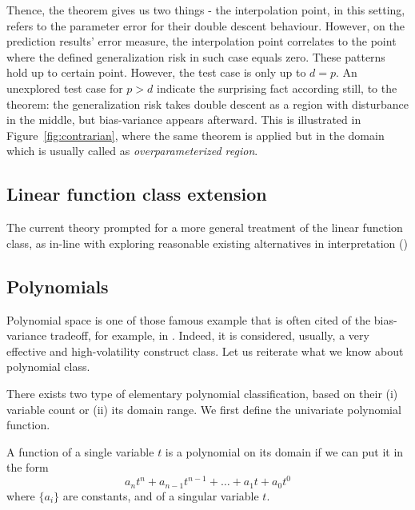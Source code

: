 \documentclass[10pt]{article} %
\begin{document}
Thence, the theorem gives us two things - the interpolation point, in this setting, refers to the parameter error for their double descent behaviour. However, on the prediction results' error measure, the interpolation point correlates to the point where the defined generalization risk in such case equals zero. These patterns hold up to certain point. However, the test case is only up to $d=p$. An unexplored test case for $p>d$ indicate the surprising fact according still, to the theorem: the generalization risk takes double descent as a region with disturbance in the middle, but bias-variance appears afterward. This is illustrated in Figure~\ref{fig:contrarian}, where the same theorem is applied but in the domain which is usually called as \textit{overparameterized region}. 
\subsection{Linear function class extension}

The current theory prompted for a more general treatment of the linear function class, as in-line with exploring reasonable existing alternatives in interpretation (\cite{nakkiran2019datahurtlinearregression})

\subsection{Polynomials}

Polynomial space is one of those famous example that is often cited of the bias-variance tradeoff, for example, in \cite{goodfellow2016deep,10.5555/2930837}. Indeed, it is considered, usually, a very effective and high-volatility construct class. Let us reiterate what we know about polynomial class. 

There exists two type of elementary polynomial classification, based on their (i) variable count or (ii) its domain range. We first define the univariate polynomial function.

\begin{definition}
    A function of a single variable $t$ is a polynomial on its domain if we can put it in the form 
    \begin{equation}
        a_{n}t^{n} + a_{n-1}t^{n-1} + \dots + a_{1}t + a_{0}t^{0}
    \end{equation}
    where $\{a_{i}\}$ are constants, and of a singular variable $t$.  
\end{definition}
\end{document}
